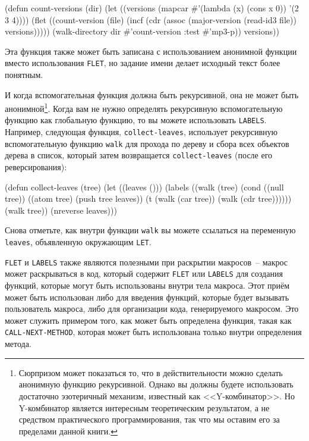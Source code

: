 \begin{myverb}
(defun count-versions (dir)
  (let ((versions (mapcar #'(lambda (x) (cons x 0)) '(2 3 4))))
    (flet ((count-version (file)
             (incf (cdr (assoc (major-version (read-id3 file)) versions)))))
      (walk-directory dir #'count-version :test #'mp3-p))
    versions))
\end{myverb}

Эта функция также может быть записана с использованием анонимной функции вместо
использования \lstinline{FLET}, но задание имени делает исходный текст более понятным.

И когда вспомогательная функция должна быть рекурсивной, она не может быть
анонимной\footnote{Сюрпризом может показаться то, что в действительности можно сделать
  анонимную функцию рекурсивной.  Однако вы должны будете использовать достаточно
  эзотеричный механизм, известный как <<Y-комбинатор>>.  Но Y-комбинатор является интересным
  теоретическим результатом, а не средством практического программирования, так что мы
  оставим его за пределами данной книги.}.  Когда вам не нужно определять рекурсивную
вспомогательную функцию как глобальную функцию, то вы можете использовать \lstinline{LABELS}.
Например, следующая функция, \lstinline{collect-leaves}, использует рекурсивную вспомогательную
функцию \lstinline{walk} для прохода по дереву и сбора всех объектов дерева в список, который
затем возвращается \lstinline{collect-leaves} (после его реверсирования):

\begin{myverb}
(defun collect-leaves (tree)
  (let ((leaves ()))
    (labels ((walk (tree)
               (cond
                 ((null tree))
                 ((atom tree) (push tree leaves))
                 (t (walk (car tree))
                    (walk (cdr tree))))))
      (walk tree))
    (nreverse leaves)))
\end{myverb}


Снова отметьте, как внутри функции \lstinline{walk} вы можете ссылаться на переменную
\lstinline{leaves}, объявленную окружающим \lstinline{LET}.

\lstinline{FLET} и \lstinline{LABELS} также являются полезными при раскрытии макросов~-- макрос
может раскрываться в код, который содержит \lstinline{FLET} или \lstinline{LABELS} для создания
функций, которые могут быть использованы внутри тела макроса.  Этот приём может быть
использован либо для введения функций, которые будет вызывать пользователь макроса, либо
для организации кода, генерируемого макросом.  Это может служить примером того, как может
быть определена функция, такая как \lstinline{CALL-NEXT-METHOD}, которая может быть
использована только внутри определения метода.

